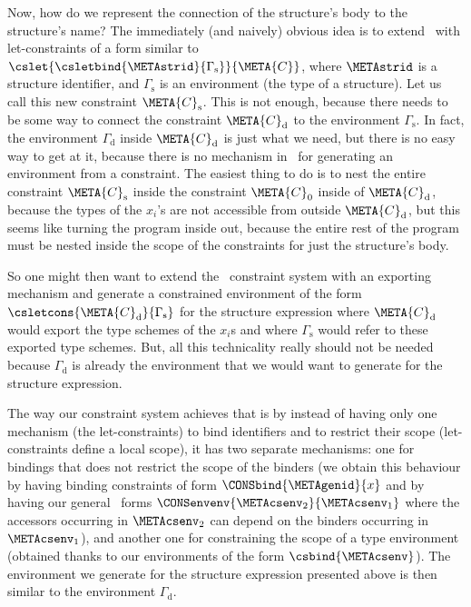 \documentclass{jfp1}
\begin{document}
Now, how do we represent the connection of the structure's body to the
structure's name?
The immediately (and naively) obvious idea is to extend \PR\ with
let-constraints of a form similar to
$\cslet{\csletbind{\METAstrid}{\Gamma_{\mathrm{s}}}}{\META{C}}$,
where $\METAstrid$ is a structure identifier, and
$\Gamma_{\mathrm{s}}$ is an environment (the type of a structure).
Let us call this new constraint $\META{C}_{\mathrm{s}}$.
This is not enough, because there needs to be some way to connect the
constraint $\META{C}_{\mathrm{d}}$ to the environment
$\Gamma_{\mathrm{s}}$.
In fact, the environment $\Gamma_{\mathrm{d}}$ inside
$\META{C}_{\mathrm{d}}$ is just what we need, but there is no easy way
to get at it, because there is no mechanism in \PR\ for generating an
environment from a constraint.
The easiest thing to do is to nest the entire constraint
$\META{C}_{\mathrm{s}}$ inside the constraint $\META{C}_0$ inside of
$\META{C}_{\mathrm{d}}$, because the types of the $x_i$'s are not
accessible from outside $\META{C}_{\mathrm{d}}$, but this seems like
turning the program inside out, because the entire rest of the program
must be nested inside the scope of the constraints for just the
structure's body.

So one might then want to extend the \PR\ constraint system
with an exporting mechanism and generate a constrained environment of
the form $\csletcons{\META{C}_{\mathrm{d}}}{\Gamma_{\mathrm{s}}}$ for
the structure expression where $\META{C}_{\mathrm{d}}$ would export
the type schemes of the $x_i$s and where
$\Gamma_{\mathrm{s}}$ would refer to these exported type
schemes.
But, all this technicality really should not be needed because
$\Gamma_{\mathrm{d}}$ is already the environment that we would want to
generate for the structure expression.

%
%

The way our constraint system achieves that is by instead of having
only one mechanism (the let-constraints) to bind identifiers and to
restrict their scope (let-constraints define a local scope),
it has two separate mechanisms: one for bindings that does not restrict
the scope of the binders (we obtain this behaviour by having binding
constraints of form $\CONSbind{\METAgenid}{x}$ and by having our
general \COMPENV\ forms
$\CONSenvenv{\METAcsenv_2}{\METAcsenv_1}$ where the accessors occurring
in $\METAcsenv_2$ can depend on the binders occurring in
$\METAcsenv_1$), and another one for constraining the scope of a type
environment (obtained thanks to our environments of the form
$\csbind{\METAcsenv}$).
%
The environment we generate for the structure expression presented
above is then similar to the environment $\Gamma_{\mathrm{d}}$.
\end{document}
